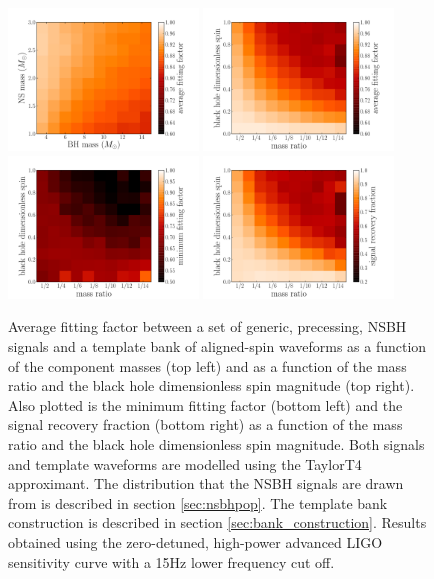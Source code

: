 \begin{figure}
    \centering
    \begin{minipage}[l]{2.0\columnwidth}
    \centering
\includegraphics[width=0.45\textwidth]
{papers/nsbh_effectualness/figure11A.pdf}
\includegraphics[width=0.45\textwidth]
{papers/nsbh_effectualness/figure11B.pdf}
\includegraphics[width=0.45\textwidth]
{papers/nsbh_effectualness/figure11C.pdf}
\includegraphics[width=0.45\textwidth]
{papers/nsbh_effectualness/figure11D.pdf}
\caption{\label{fig:aspinavFF}
Average fitting factor between a set of generic, precessing, NSBH
signals and a template bank of aligned-spin waveforms as a function of the
component masses (top left) and as a function of the
mass ratio and the black hole dimensionless spin
magnitude (top right). Also plotted is the minimum fitting factor (bottom left) 
and the signal recovery fraction (bottom right) as a function of the
mass ratio and the black hole dimensionless spin magnitude. Both signals and
template waveforms are modelled using the TaylorT4 approximant.
The distribution that the NSBH signals are drawn from
is described in section \ref{sec:nsbhpop}. The template bank construction
is described in section \ref{sec:bank_construction}. Results obtained
using the zero-detuned, high-power advanced LIGO sensitivity curve with a 15Hz
lower frequency cut off.
}
\end{minipage}
\end{figure}

